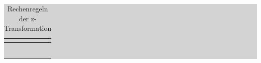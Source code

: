 \begin{table}[H]
\setlength{\arrayrulewidth}{.1em}
\caption{Rechenregeln der z-Transformation}
\setlength{\fboxsep}{0pt}%
\colorbox{lightgray}{%
%
\begin{tabular}{| c | c | c |}
\hline
\parbox[c][0.3in][c]{1.9in}{\smallskip\centering\textbf{\selectfont{Regel}}} & \parbox[c][0.3in][c]{2.2in}{\smallskip\centering\textbf{\selectfont{Funktion x(t)}}} &
\parbox[c][0.3in][c]{2.2in}{\smallskip\centering\textbf{\selectfont{Laplace-Transformierte X(s)}}}\\ \hline


\parbox[c][0.5in][c]{1.9in}{} & 
\parbox[c][0.5in][c]{2.2in}{} &
\parbox[c][0.5in][c]{2.2in}{}\\
\hline

\parbox[c][0.5in][c]{1.9in}{} & 
\parbox[c][0.5in][c]{2.2in}{} &
\parbox[c][0.5in][c]{2.2in}{}\\
\hline

\parbox[c][0.5in][c]{1.9in}{} & 
\parbox[c][0.5in][c]{2.2in}{} &
\parbox[c][0.5in][c]{2.2in}{}\\
\hline

\parbox[c][0.5in][c]{1.9in}{} & 
\parbox[c][0.5in][c]{2.2in}{} &
\parbox[c][0.5in][c]{2.2in}{}\\
\hline

\parbox[c][0.5in][c]{1.9in}{} & 
\parbox[c][0.5in][c]{2.2in}{} &
\parbox[c][0.5in][c]{2.2in}{}\\
\hline

\parbox[c][0.5in][c]{1.9in}{} & 
\parbox[c][0.5in][c]{2.2in}{} &
\parbox[c][0.5in][c]{2.2in}{}\\
\hline


\end{tabular}}
\end{table}
